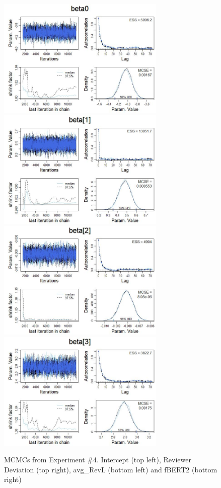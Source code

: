 \documentclass[man, floatsintext, 10pt]{apa6}
\begin{document}
\begin{figure}
\includegraphics[width=8cm]{Intercept_exp4.jpg}
\includegraphics[width=8cm]{ReviewerDevExp4.jpg} \\
\includegraphics[width=8cm]{AvgRevLenExp4.jpg}
\includegraphics[width=8cm]{BERTExp4.jpg}
\caption{MCMCs from Experiment \#4. Intercept (top left), Reviewer Deviation (top right), avg\_RevL (bottom left) and fBERT2 (bottom right)}
\label{Exp4MCMC}
\end{figure}
\end{document}
